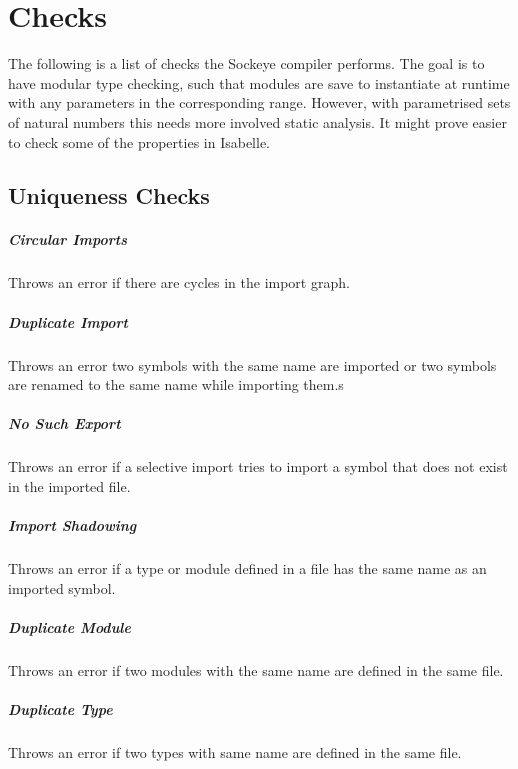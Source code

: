 \documentclass[a4paper,11pt,twoside]{report}
\begin{document}
{{{\chapter{Checks}
\label{chap:checks}
The following is a list of checks the Sockeye compiler performs.
The goal is to have modular type checking, such that modules are save to instantiate at runtime with any parameters in the corresponding range.
However, with parametrised sets of natural numbers this needs more involved static analysis.
It might prove easier to check some of the properties in Isabelle.

\section{Uniqueness Checks}
\paragraph{Circular Imports}
Throws an error if there are cycles in the import graph.

\paragraph{Duplicate Import}
Throws an error two symbols with the same name are imported or two symbols are renamed to the same name while importing them.s

\paragraph{No Such Export}
Throws an error if a selective import tries to import a symbol that does not exist in the imported file.

\paragraph{Import Shadowing}
Throws an error if a type or module defined in a file has the same name as an imported symbol.

\paragraph{Duplicate Module}
Throws an error if two modules with the same name are defined in the same file.

\paragraph{Duplicate Type}
Throws an error if two types with same name are defined in the same file.

}}}
\end{document}
